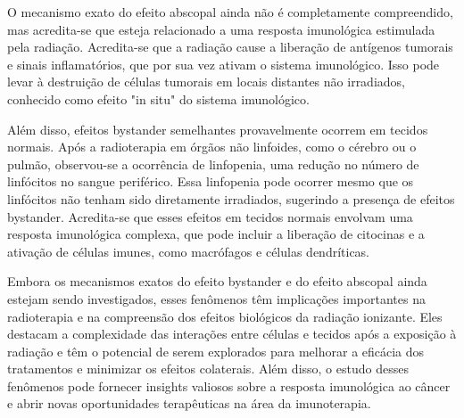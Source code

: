 \documentclass[11pt,a4paper]{article}
\begin{document}
	O mecanismo exato do efeito abscopal ainda não é completamente compreendido, mas acredita-se que esteja relacionado a uma resposta imunológica estimulada pela radiação. Acredita-se que a radiação cause a liberação de antígenos tumorais e sinais inflamatórios, que por sua vez ativam o sistema imunológico. Isso pode levar à destruição de células tumorais em locais distantes não irradiados, conhecido como efeito "in situ" do sistema imunológico.
	

	Além disso, efeitos bystander semelhantes provavelmente ocorrem em tecidos normais. Após a radioterapia em órgãos não linfoides, como o cérebro ou o pulmão, observou-se a ocorrência de linfopenia, uma redução no número de linfócitos no sangue periférico. Essa linfopenia pode ocorrer mesmo que os linfócitos não tenham sido diretamente irradiados, sugerindo a presença de efeitos bystander. Acredita-se que esses efeitos em tecidos normais envolvam uma resposta imunológica complexa, que pode incluir a liberação de citocinas e a ativação de células imunes, como macrófagos e células dendríticas.

	Embora os mecanismos exatos do efeito bystander e do efeito abscopal ainda estejam sendo investigados, esses fenômenos têm implicações importantes na radioterapia e na compreensão dos efeitos biológicos da radiação ionizante. Eles destacam a complexidade das interações entre células e tecidos após a exposição à radiação e têm o potencial de serem explorados para melhorar a eficácia dos tratamentos e minimizar os efeitos colaterais. Além disso, o estudo desses fenômenos pode fornecer insights valiosos sobre a resposta imunológica ao câncer e abrir novas oportunidades terapêuticas na área da imunoterapia.



\end{document}
